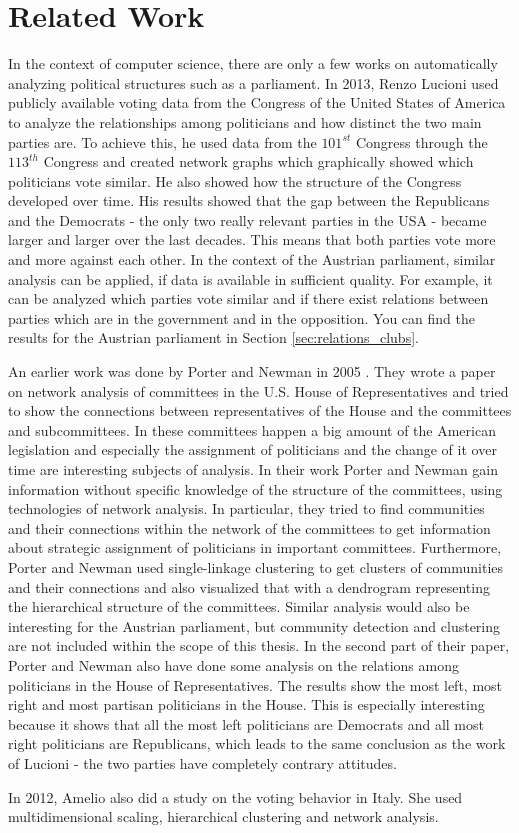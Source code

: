 \chapter{Related Work}
\label{chap:relatedwork}

In the context of computer science, there are only a few works on automatically analyzing political structures such as a parliament. In 2013, Renzo Lucioni \cite{Lucioni_2015} used publicly available voting data from the Congress of the United States of America to analyze the relationships among politicians and how distinct the two main parties are. To achieve this, he used data from the $101^{st}$ Congress through the $113^{th}$ Congress and created network graphs which graphically showed which politicians vote similar. He also showed how the structure of the Congress developed over time. His results showed that the gap between the Republicans and the Democrats - the only two really relevant parties in the USA - became larger and larger over the last decades. This means that both parties vote more and more against each other. In the context of the Austrian parliament, similar analysis can be applied, if data is available in sufficient quality. For example, it can be analyzed which parties vote similar and if there exist relations between parties which are in the government and in the opposition. You can find the results for the Austrian parliament in Section \ref{sec:relations_clubs}.

An earlier work was done by Porter and Newman in 2005 \cite{Porter_2005}. They wrote a paper on network analysis of committees in the U.S. House of Representatives and tried to show the connections between representatives of the House and the committees and subcommittees. In these committees happen a big amount of the American legislation and especially the assignment of politicians and the change of it over time are interesting subjects of analysis. In their work Porter and Newman gain information without specific knowledge of the structure of the committees, using technologies of network analysis. In particular, they tried to find communities and their connections within the network of the committees to get information about strategic assignment of politicians in important committees. Furthermore, Porter and Newman used single-linkage clustering to get clusters of communities and their connections and also visualized that with a dendrogram representing the hierarchical structure of the committees. Similar analysis would also be interesting for the Austrian parliament, but community detection and clustering are not included within the scope of this thesis. In the second part of their paper, Porter and Newman also have done some analysis on the relations among politicians in the House of Representatives. The results show the most left, most right and most partisan politicians in the House. This is especially interesting because it shows that all the most left politicians are Democrats and all most right politicians are Republicans, which leads to the same conclusion as the work of Lucioni \cite{Lucioni_2015} - the two parties have completely contrary attitudes.

In 2012, Amelio \cite{Amelio_2012} also did a study on the voting behavior in Italy. She used multidimensional scaling, hierarchical clustering and network analysis.






